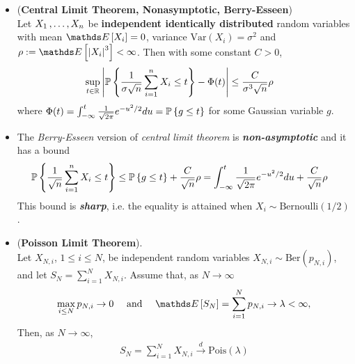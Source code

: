 \documentclass[11pt]{article}
\begin{document}
\begin{itemize}
\item \begin{theorem} (\textbf{Central Limit Theorem, Nonasymptotic, Berry-Esseen}) \citep{vershynin2018high} \\
Let $X_1 \,{,}\ldots{,}\, X_n$ be \textbf{independent identically distributed} random variables with mean $\E{}{X_i} = 0$, variance $\text{Var}(X_i) = \sigma^2$ and $\rho := \E{}{\abs{X_i}^3} <\infty$. Then with some constant $C > 0$, 
\begin{align}
\sup_{t \in {\mathbb R}}\left\lvert {\mathbb P}\left\{\frac{1}{\sigma \sqrt{n}}\sum_{i=1}^{n}X_i \le t\right\} - \Phi(t) \right\rvert &\le  \frac{C}{ \sigma^3\sqrt{n}}\rho \label{eqn: central_limit_theorem_nonasym} 
\end{align} where $\Phi(t) = \int_{-\infty}^{t}\frac{1}{\sqrt{2\pi}}e^{-u^2/2}du = {\mathbb P}\left\{g \le t\right\}$ for some Gaussian variable $g$.
\end{theorem}

\item \begin{remark} The \emph{Berry-Esseen} version of \emph{central limit theorem} is \emph{\textbf{non-asymptotic}} and it has a bound
\begin{align*}
{\mathbb P}\left\{\frac{1}{\sqrt{n}}\sum_{i=1}^{n}X_i \le t\right\} &\le {\mathbb P}\left\{g \le t\right\} + \frac{C}{\sqrt{n}}\rho = \int_{-\infty}^{t}\frac{1}{\sqrt{2\pi}}e^{-u^2/2}du +  \frac{C}{\sqrt{n}}\rho 
\end{align*} This bound is \emph{\textbf{sharp}}, i.e. the equality is attained when $X_i \sim \text{Bernoulli}(1/2)$.
\end{remark}

\item \begin{theorem} (\textbf{Poisson Limit Theorem}).   \citep{vershynin2018high} \\
Let $X_{N,i}$, $1 \le i \le N$, be independent random variables $X_{N,i} \sim \text{Ber}(p_{N,i})$, and let $S_N = \sum^{N}_{i=1}X_{N,i}$. Assume that, as $N \to \infty$
\begin{align*}
\max_{i\le N}p_{N,i} \rightarrow 0\quad  \text{ and }\quad \E{}{S_N} = \sum^{N}_{i=1}p_{N,i} \rightarrow \lambda < \infty,
\end{align*}
Then, as $N \to \infty$,
\begin{align*}
S_N =  \sum^{N}_{i=1}X_{N,i} \stackrel{d}{\rightarrow} \text{Pois}(\lambda)
\end{align*}
\end{theorem}
\end{itemize}
\end{document}
